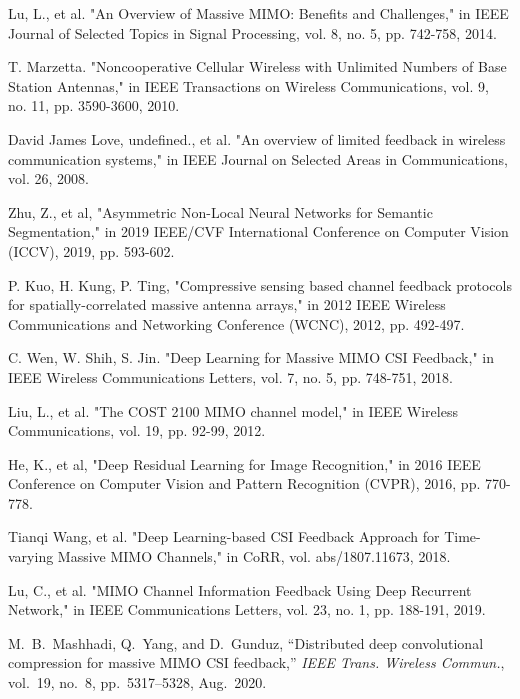 \documentclass[lettersize,journal]{IEEEtran}
\begin{document}
\begin{thebibliography}{00}
    Lu, L., et al. "An Overview of Massive MIMO: Benefits and Challenges," in IEEE Journal of Selected Topics in Signal Processing, vol. 8, no. 5, pp. 742-758, 2014.

    T. Marzetta. "Noncooperative Cellular Wireless with Unlimited Numbers of Base Station Antennas," in IEEE Transactions on Wireless Communications, vol. 9, no. 11, pp. 3590-3600, 2010.

    David James Love, undefined., et al. "An overview of limited feedback in wireless communication systems," in IEEE Journal on Selected Areas in Communications, vol. 26, 2008.

    Zhu, Z., et al, "Asymmetric Non-Local Neural Networks for Semantic Segmentation," in 2019 IEEE/CVF International Conference on Computer Vision (ICCV), 2019, pp. 593-602.

    P. Kuo, H. Kung, P. Ting, "Compressive sensing based channel feedback protocols for spatially-correlated massive antenna arrays," in 2012 IEEE Wireless Communications and Networking Conference (WCNC), 2012, pp. 492-497.

    C. Wen, W. Shih, S. Jin. "Deep Learning for Massive MIMO CSI Feedback," in IEEE Wireless Communications Letters, vol. 7, no. 5, pp. 748-751, 2018.

    Liu, L., et al. "The COST 2100 MIMO channel model," in IEEE Wireless Communications, vol. 19, pp. 92-99, 2012.

    He, K., et al, "Deep Residual Learning for Image Recognition," in 2016 IEEE Conference on Computer Vision and Pattern Recognition (CVPR), 2016, pp. 770-778.

    Tianqi Wang, et al. "Deep Learning-based CSI Feedback Approach for Time-varying Massive MIMO Channels," in CoRR, vol. abs/1807.11673, 2018.

    Lu, C., et al. "MIMO Channel Information Feedback Using Deep Recurrent Network," in IEEE Communications Letters, vol. 23, no. 1, pp. 188-191, 2019.

    M.~B.~Mashhadi, Q.~Yang, and D.~Gunduz, ``Distributed deep convolutional compression for massive MIMO CSI feedback,'' \textit{IEEE Trans. Wireless Commun.}, vol.~19, no.~8, pp.~5317--5328, Aug.~2020.


\end{thebibliography}
\end{document}
